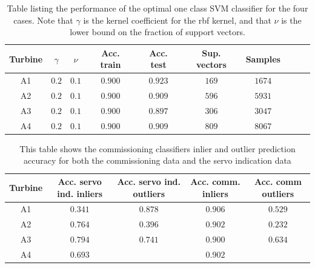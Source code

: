             
            \begin{table}[]
                \centering
                \begin{tabular}{|c|c|c|c|c|c|c|c|c|c|}
                    \hline
                    Turbine &$\gamma$   & $\nu$     & Acc. train    & Acc. test & Sup. vectors  & Samples  \\ \hline
                    A1      & $0.2$    & $0.1$    & $0.900$       & $0.923$   &$169$         & $1674$\\ \hline
                    A2      & $0.2$    & $0.1$    & $0.900$       & $0.909$   &$596$         & $5931$\\ \hline
                    A3      & $0.2$    & $0.1$    & $0.900$       & $0.897$   &$306$         & $3047$\\ \hline
                    A4      & $0.2$    & $0.1$    & $0.900$       & $0.909$   &$809$         & $8067$\\ \hline
                \end{tabular}
                \caption{Table listing the performance of the optimal one class SVM classifier for the four cases. Note that $\gamma$ is the kernel coefficient for the rbf kernel, and that $\nu$ is the lower bound on the fraction of support vectors. }
                \label{tab:one_class_startup}
            \end{table}
            
            \begin{table}[]
                \centering
                \begin{tabular}{|c|c|c|c|c|}
                     \hline
                     Turbine    & Acc. servo ind. inliers & Acc. servo ind. outliers    & Acc. comm. inliers  & Acc. comm outliers     \\ \hline
                     A1         & $0.341$                       & $0.878$                           & $0.906$               & $0.529$                   \\ \hline
                     A2         & $0.764$                       & $0.396$                           & $0.902$               & $0.232$                   \\ \hline
                     A3         & $0.794$                       & $0.741$                           & $0.900$               & $0.634$                   \\ \hline   
                     A4         & $0.693$                       &                                   & $0.902$               &                           \\ \hline
                \end{tabular}
                \caption{This table shows the commissioning classifiers inlier and outlier prediction accuracy for both the commissioning data and the servo indication data}
                \label{tab:one_svm_outlier}
            \end{table}
    
